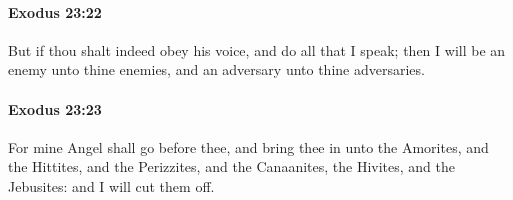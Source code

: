 		\paragraph{Exodus 23:22} %
			\label{EXODUS-23-22}

			But if thou shalt indeed obey his voice, and do all that I speak; then I will be an enemy unto thine enemies, and an adversary unto thine adversaries.


		\paragraph{Exodus 23:23} %
			\label{EXODUS-23-23}

			For mine Angel shall go before thee, and bring thee in unto the Amorites, and the Hittites, and the Perizzites, and the Canaanites, the Hivites, and the Jebusites: and I will cut them off.


